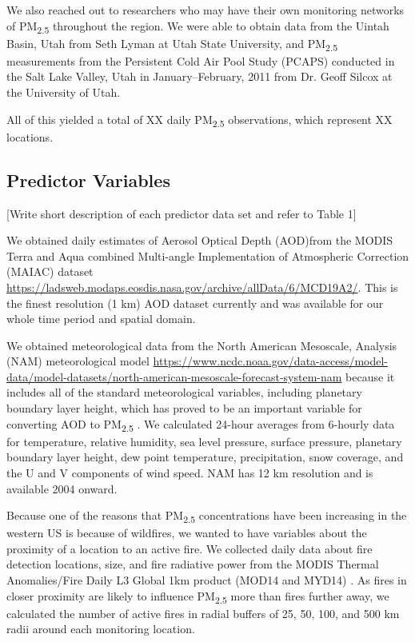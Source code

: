 \documentclass[english]{article}
\begin{document}
We also reached out to researchers who may have their own monitoring networks of PM\textsubscript{2.5} throughout the region. We were able to obtain data from the Uintah Basin, Utah from Seth Lyman at Utah State University, and PM\textsubscript{2.5} measurements from the Persistent Cold Air Pool Study (PCAPS) \cite{Silcox_wintertime_2012} conducted in the Salt Lake Valley, Utah in January--February, 2011 from Dr. Geoff Silcox at the University of Utah.  

All of this yielded a total of XX daily PM\textsubscript{2.5} observations, which represent XX locations. 

\subsection*{Predictor Variables}

[Write short description of each predictor data set and refer to Table 1]

We obtained daily estimates of Aerosol Optical Depth (AOD)from the MODIS Terra and Aqua combined Multi-angle Implementation of Atmospheric Correction (MAIAC) dataset \url{https://ladsweb.modaps.eosdis.nasa.gov/archive/allData/6/MCD19A2/}. This is the finest resolution (1 km) AOD dataset currently and was available for our whole time period and spatial domain. 


We obtained meteorological data from the North American Mesoscale, Analysis (NAM) meteorological model \url{https://www.ncdc.noaa.gov/data-access/model-data/model-datasets/north-american-mesoscale-forecast-system-nam} because it includes all of the standard meteorological variables, including planetary boundary layer height, which has proved to be an important variable for converting AOD to PM\textsubscript{2.5} \cite{liu_estimating_2005}. We calculated 24-hour averages from 6-hourly data for temperature, relative humidity, sea level pressure, surface pressure, planetary boundary layer height, dew point temperature, precipitation, snow coverage, and the U and V components of wind speed. NAM has 12 km resolution and is available 2004 onward.

Because one of the reasons that PM\textsubscript{2.5} concentrations have been increasing in the western US is because of wildfires, we wanted to have variables about the proximity of a location to an active fire. We collected daily data about fire detection locations, size, and fire radiative power from the MODIS Thermal Anomalies/Fire Daily L3 Global 1km product (MOD14 and MYD14) \cite{Giglio2006,Hawbaker2017}. As fires in closer proximity are likely to influence PM\textsubscript{2.5} more than fires further away, we calculated the number of active fires in radial buffers of 25, 50, 100, and 500 km radii around each monitoring location. 
\end{document}
